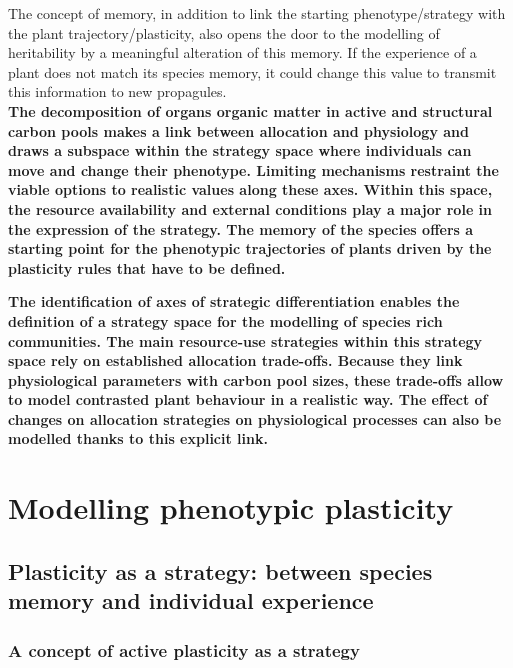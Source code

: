  
 The concept of memory, in addition to link the starting phenotype/strategy with the plant trajectory/plasticity, also opens the door to the modelling of heritability by a meaningful alteration of this memory. If the experience of a plant does not match its species memory, it could change this value to transmit this information to new propagules.\\

%


\textbf{The decomposition of organs organic matter in active and structural carbon pools makes a link between allocation and physiology and draws a subspace within the strategy space where individuals can move and change their phenotype. Limiting mechanisms restraint the viable options to realistic values along these axes. Within this space, the resource availability and external conditions play a major role in the expression of the strategy. The memory of the species offers a starting point for the phenotypic trajectories of plants driven by the plasticity rules that have to be defined.\\ %
}


\textbf{The identification of axes of strategic differentiation enables the definition of a strategy space for the modelling of species rich communities. The main resource-use strategies within this strategy space rely on established allocation trade-offs. Because they link physiological parameters with carbon pool sizes, these trade-offs allow to model contrasted plant behaviour in a realistic way. The effect of changes on allocation strategies on physiological processes can also be modelled thanks to this explicit link.}

\chapter{Modelling phenotypic plasticity}\label{chapter:modelling_PP}


\section{Plasticity as a strategy: between species memory and individual experience}

\subsection{A concept of active plasticity as a strategy}
